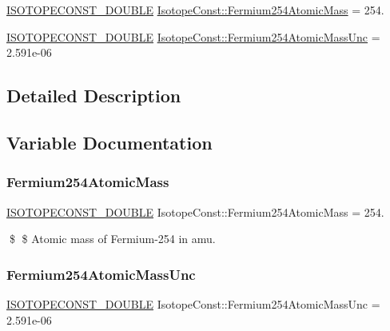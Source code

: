 \begin{DoxyCompactItemize}
\item 
\mbox{\hyperlink{group___isotope_const-_macros_ga8f45a7272ce02c0b4c65c44636ed719a}{I\+S\+O\+T\+O\+P\+E\+C\+O\+N\+S\+T\+\_\+\+D\+O\+U\+B\+LE}} \mbox{\hyperlink{group___isotope_const-_fermium-_fm254_ga66c780406657c3fd84254d5edb343628}{Isotope\+Const\+::\+Fermium254\+Atomic\+Mass}} = 254.
\item 
\mbox{\hyperlink{group___isotope_const-_macros_ga8f45a7272ce02c0b4c65c44636ed719a}{I\+S\+O\+T\+O\+P\+E\+C\+O\+N\+S\+T\+\_\+\+D\+O\+U\+B\+LE}} \mbox{\hyperlink{group___isotope_const-_fermium-_fm254_ga7e2e77c9cf156fb8d967987cea0e372c}{Isotope\+Const\+::\+Fermium254\+Atomic\+Mass\+Unc}} = 2.\+591e-\/06
\end{DoxyCompactItemize}


\subsection{Detailed Description}


\subsection{Variable Documentation}
\mbox{\label{group___isotope_const-_fermium-_fm254_ga66c780406657c3fd84254d5edb343628}} 
\subsubsection{\texorpdfstring{Fermium254\+Atomic\+Mass}{Fermium254AtomicMass}}
{\footnotesize\ttfamily \mbox{\hyperlink{group___isotope_const-_macros_ga8f45a7272ce02c0b4c65c44636ed719a}{I\+S\+O\+T\+O\+P\+E\+C\+O\+N\+S\+T\+\_\+\+D\+O\+U\+B\+LE}} Isotope\+Const\+::\+Fermium254\+Atomic\+Mass = 254.}

\$ \$ Atomic mass of Fermium-\/254 in amu. \mbox{\label{group___isotope_const-_fermium-_fm254_ga7e2e77c9cf156fb8d967987cea0e372c}} 
\subsubsection{\texorpdfstring{Fermium254\+Atomic\+Mass\+Unc}{Fermium254AtomicMassUnc}}
{\footnotesize\ttfamily \mbox{\hyperlink{group___isotope_const-_macros_ga8f45a7272ce02c0b4c65c44636ed719a}{I\+S\+O\+T\+O\+P\+E\+C\+O\+N\+S\+T\+\_\+\+D\+O\+U\+B\+LE}} Isotope\+Const\+::\+Fermium254\+Atomic\+Mass\+Unc = 2.\+591e-\/06}

